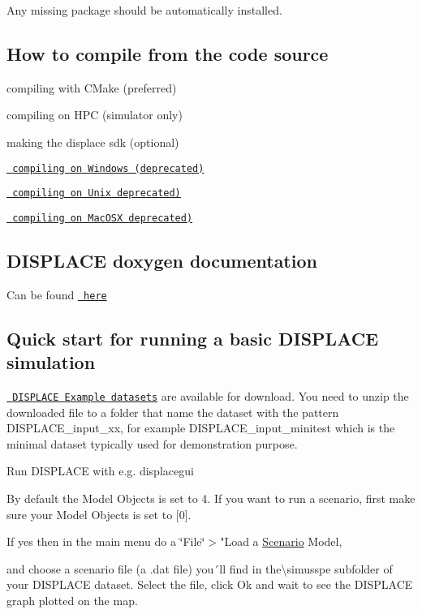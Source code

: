Any missing package should be automatically installed.

\subsection*{How to compile from the code source}

compiling with C\+Make (preferred)

compiling on H\+PC (simulator only)

making the displace sdk (optional)

\href{docs/Building.win}{\texttt{ compiling on Windows (deprecated)}}

\href{docs/Building.unix}{\texttt{ compiling on Unix deprecated)}}

\href{docs/Building.MacOSX}{\texttt{ compiling on Mac\+O\+SX deprecated)}}

\subsection*{D\+I\+S\+P\+L\+A\+CE doxygen documentation}

Can be found \href{https://github.com/frabas/DISPLACE_GUI/blob/master/html/index.html}{\texttt{ here}}

\subsection*{Quick start for running a basic D\+I\+S\+P\+L\+A\+CE simulation}

\href{https://displace-project.org/blog/download/}{\texttt{ D\+I\+S\+P\+L\+A\+CE Example datasets}} are available for download. You need to unzip the downloaded file to a folder that name the dataset with the pattern D\+I\+S\+P\+L\+A\+C\+E\+\_\+input\+\_\+xx, for example D\+I\+S\+P\+L\+A\+C\+E\+\_\+input\+\_\+minitest which is the minimal dataset typically used for demonstration purpose.

Run D\+I\+S\+P\+L\+A\+CE with e.\+g. displacegui

By default the Model Objects is set to 4. If you want to run a scenario, first make sure your Model Objects is set to \mbox{[}0\mbox{]}.



If yes then in the main menu do a \char`\"{}\+File\char`\"{}$>$"Load a \mbox{\hyperlink{class_scenario}{Scenario}} Model,



and choose a scenario file (a .dat file) you´ll find in the\textbackslash{}simusspe subfolder of your D\+I\+S\+P\+L\+A\+CE dataset. Select the file, click Ok and wait to see the D\+I\+S\+P\+L\+A\+CE graph plotted on the map.



